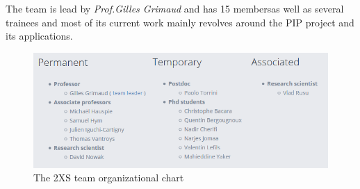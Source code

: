 The team is lead by \textit{Prof.Gilles Grimaud} and has 15 members\footnotemark[1] as well as several trainees and most of its current work mainly revolves around the PIP project and its applications.

\begin{figure}[!ht]
	\centering 
	\includegraphics[width=\linewidth, frame]{img/2XS.png} 
	\caption[The 2XS team organizational chart]{The 2XS team organizational chart\cite{cristal}}
\end{figure}





